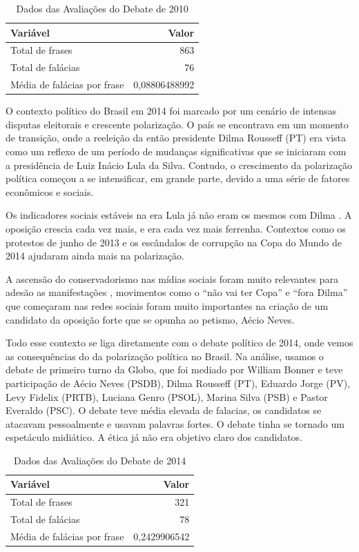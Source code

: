 \documentclass[12pt]{article}
\begin{document}
\begin{table}[ht]
\centering
\caption{Dados das Avaliações do Debate de 2010}
\label{tab:exTable1}
\begin{tabular}{l r}
\hline
\textbf{Variável} & \textbf{Valor} \\
\hline
Total de frases & 863 \\
Total de falácias & 76 \\
Média de falácias por frase & 0,08806488992 \\
\hline
\end{tabular}
\end{table}

O contexto político do Brasil em 2014 foi marcado por um cenário de intensas disputas eleitorais e crescente polarização. O país se encontrava em um momento de transição, onde a reeleição da então presidente Dilma Rousseff (PT) era vista como um reflexo de um período de mudanças significativas que se iniciaram com a presidência de Luiz Inácio Lula da Silva. Contudo, o crescimento da polarização política começou a se intensificar, em grande parte, devido a uma série de fatores econômicos e sociais.

Os indicadores sociais estáveis na era Lula já não eram os mesmos com Dilma \cite{IBRE-9}. A oposição crescia cada vez mais, e era cada vez mais ferrenha. Contextos como os protestos de junho de 2013 e os escândalos de corrupção na Copa do Mundo de 2014 ajudaram ainda mais na polarização. 

A ascensão do conservadorismo nas mídias sociais foram muito relevantes para adesão as manifestações \cite{Esther-10}, movimentos como o “não vai ter Copa” e “fora Dilma” que começaram nas redes sociais foram muito importantes na criação de um candidato da oposição forte que se opunha ao petismo, Aécio Neves.

Todo esse contexto se liga diretamente com o debate político de 2014, onde vemos as consequências do da polarização política no Brasil. Na análise, usamos o debate de primeiro turno da Globo, que foi mediado por William Bonner e teve participação de Aécio Neves (PSDB), Dilma Rousseff (PT), Eduardo Jorge (PV), Levy Fidelix (PRTB), Luciana Genro (PSOL), Marina Silva (PSB) e Pastor Everaldo (PSC). O debate teve média elevada de falacias, os candidatos se atacavam pessoalmente e usavam palavras fortes. O debate tinha se tornado um espetáculo midiático. A ética já não era objetivo claro dos candidatos.

\begin{table}[ht]
\centering
\caption{Dados das Avaliações do Debate de 2014}
\label{tab:exTable1}
\begin{tabular}{l r}
\hline
\textbf{Variável} & \textbf{Valor} \\
\hline
Total de frases & 321 \\
Total de falácias & 78 \\
Média de falácias por frase & 0,2429906542 \\
\hline
\end{tabular}
\end{table}
\end{document}
